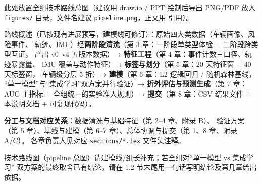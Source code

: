 \begin{TODO}
此处放置全组技术路线总图（建议用 draw.io / PPT 绘制后导出 PNG/PDF 放入
\texttt{figures/} 目录，文件名建议 \texttt{pipeline.png}，正文用
引用）。
\end{TODO}

路线概述（已按现有进展预写，建模线可修订）：原始四大类数据（车辆画像、风险事件、
轨迹、IMU）经\textbf{两阶段清洗}（第 3 章：一阶段单类型体检 + 二阶段跨类型互证，
产出 v0--v4 五版本数据）→ \textbf{特征工程}（第 4 章：事件计数三口径、轨迹暴露量、
IMU 覆盖与动作特征）→ \textbf{标签与划分}（第 5 章：20 天特征窗 + 40 天标签窗，
车辆级分层 5 折）→ \textbf{建模}（第 6 章：L2 逻辑回归 / 随机森林基线，
“单一模型”与“集成学习”双方案并行验证）→ \textbf{折外评估与预测生成}（第 7 章：
AUC 主指标 + 全组统一的实验准入规则）→ \textbf{提交}（第 8 章：CSV 结果文件 +
本说明文档 + 可复现代码）。

\begin{hlbox}
\textbf{分工与文档对应关系}：数据清洗与基础特征（第 2--4 章、附录 B）、
验证方案（第 5 章）、基线与建模（第 6--7 章）、总体协调与提交（第 1、8 章、附录 A/C）。
各章负责人见对应 \texttt{sections/*.tex} 文件头注释。
\end{hlbox}

\begin{TODO}
技术路线图（pipeline 总图）请建模线/组长补充；若全组对“单一模型 vs 集成学习”
双方案的最终取舍已有结论，请在 1.2 节末尾用一句话写明结论及第几章给出依据。
\end{TODO}
